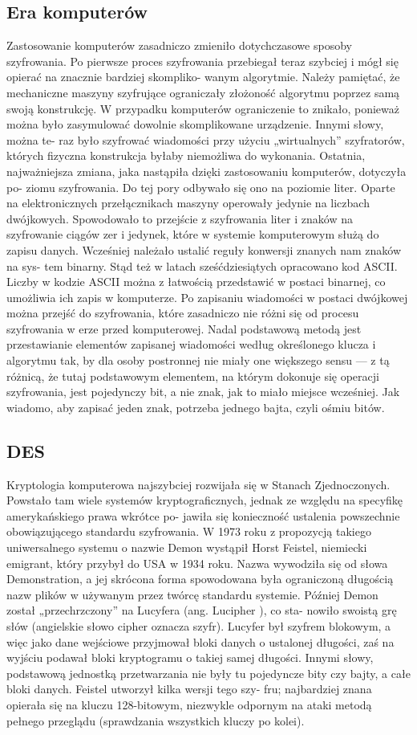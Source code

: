\documentclass[a4paper]{article}
\begin{document}
\subsection{Era komputerów}
Zastosowanie komputerów zasadniczo zmieniło dotychczasowe sposoby szyfrowania. Po pierwsze
proces szyfrowania przebiegał teraz szybciej i mógł się opierać na znacznie bardziej skompliko-
wanym algorytmie. Należy pamiętać, że mechaniczne maszyny szyfrujące ograniczały złożoność
algorytmu poprzez samą swoją konstrukcję. W przypadku komputerów ograniczenie to znikało,
ponieważ można było zasymulować dowolnie skomplikowane urządzenie. Innymi słowy, można te-
raz było szyfrować wiadomości przy użyciu „wirtualnych” szyfratorów, których fizyczna konstrukcja
byłaby niemożliwa do wykonania.
Ostatnia, najważniejsza zmiana, jaka nastąpiła dzięki zastosowaniu komputerów, dotyczyła po-
ziomu szyfrowania. Do tej pory odbywało się ono na poziomie liter. Oparte na elektronicznych
przełącznikach maszyny operowały jedynie na liczbach dwójkowych. Spowodowało to przejście z
szyfrowania liter i znaków na szyfrowanie ciągów zer i jedynek, które w systemie komputerowym
służą do zapisu danych. Wcześniej należało ustalić reguły konwersji znanych nam znaków na sys-
tem binarny. Stąd też w latach sześćdziesiątych opracowano kod ASCII.
Liczby w kodzie ASCII można z łatwością przedstawić w postaci binarnej, co umożliwia ich zapis
w komputerze. Po zapisaniu wiadomości w postaci dwójkowej można przejść do szyfrowania, które
zasadniczo nie różni się od procesu szyfrowania w erze przed komputerowej. Nadal podstawową
metodą jest przestawianie elementów zapisanej wiadomości według określonego klucza i algorytmu
tak, by dla osoby postronnej nie miały one większego sensu — z tą różnicą, że tutaj podstawowym
elementem, na którym dokonuje się operacji szyfrowania, jest pojedynczy bit, a nie znak, jak to
miało miejsce wcześniej. Jak wiadomo, aby zapisać jeden znak, potrzeba jednego bajta, czyli ośmiu
bitów.
\subsection{DES}
Kryptologia komputerowa najszybciej rozwijała się w Stanach Zjednoczonych. Powstało tam wiele
systemów kryptograficznych, jednak ze względu na specyfikę amerykańskiego prawa wkrótce po-
jawiła się konieczność ustalenia powszechnie obowiązującego standardu szyfrowania. W 1973 roku
z propozycją takiego uniwersalnego systemu o nazwie Demon wystąpił Horst Feistel, niemiecki
emigrant, który przybył do USA w 1934 roku. Nazwa wywodziła się od słowa Demonstration, a jej
skrócona forma spowodowana była ograniczoną długością nazw plików w używanym przez twórcę
standardu systemie. Później Demon został „przechrzczony” na Lucyfera (ang. Lucipher ), co sta-
nowiło swoistą grę słów (angielskie słowo cipher oznacza szyfr). Lucyfer był szyfrem blokowym, a
więc jako dane wejściowe przyjmował bloki danych o ustalonej długości, zaś na wyjściu podawał
bloki kryptogramu o takiej samej długości. Innymi słowy, podstawową jednostką przetwarzania
nie były tu pojedyncze bity czy bajty, a całe bloki danych. Feistel utworzył kilka wersji tego szy-
fru; najbardziej znana opierała się na kluczu 128-bitowym, niezwykle odpornym na ataki metodą
pełnego przeglądu (sprawdzania wszystkich kluczy po kolei).
\end{document}
